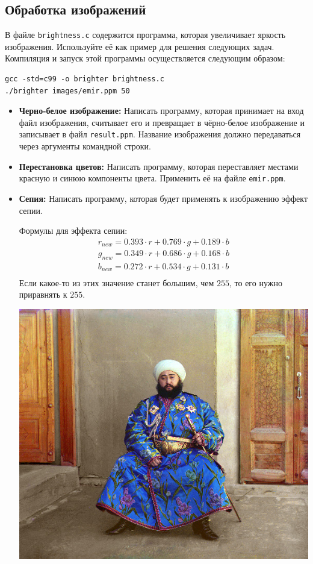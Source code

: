 \documentclass{article}
\begin{document}
\subsection*{Обработка изображений}
В файле \texttt{brightness.c} содержится программа, которая увеличивает яркость изображения. Используйте её как пример для решения следующих задач. Компиляция и запуск этой программы осуществляется следующим образом:
\begin{verbatim}
gcc -std=c99 -o brighter brightness.c
./brighter images/emir.ppm 50
\end{verbatim}
\begin{itemize}
\item \textbf{Черно-белое изображение:} Написать программу, которая принимает на вход файл изображения, считывает его и превращает в чёрно-белое изображение и записывает в файл \texttt{result.ppm}. Название изображения должно передаваться через аргументы командной строки.
\item \textbf{Перестановка цветов:} Написать программу, которая переставляет местами красную и синюю компоненты цвета. Применить её на файле \texttt{emir.ppm}.
\item \textbf{Сепия:} Написать программу, которая будет применять к изображению эффект сепии.
\begin{multicols}{3}
Формулы для эффекта сепии:
\begin{align*}
r_{new} = 0.393 \cdot r + 0.769 \cdot g + 0.189 \cdot b\\
g_{new} = 0.349 \cdot r + 0.686 \cdot g + 0.168 \cdot b\\
b_{new} = 0.272 \cdot r + 0.534 \cdot g + 0.131 \cdot b\\
\end{align*}
Если какое-то из этих значение станет большим, чем $255$, то его нужно приравнять к $255$.
\vfill			
\begin{center}
\includegraphics[scale=0.26]{../images/imageproc.jpg}

\end{center}
\end{multicols}
\end{itemize}
\end{document}
